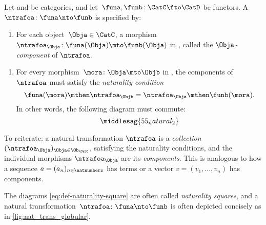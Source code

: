 \begin{ctdefinition}
    \label{def:natural-transformation}
    Let \CatC and \CatD be categories, and let~$\funa,\funb\colon \CatC\fto \CatD$ be functors.
    A \emph{}~$\ntrafoa \colon \funa\nto \funb$ is specified by:

    \constit
    \begin{enumerate}
        \item For each object~$\Obja\in \CatC$, a morphism $\ntrafoa_\Obja \colon \funa(\Obja)\mto \funb(\Obja)$ in \CatD, called the $\Obja$\emph{-component} of $\ntrafoa$.
    \end{enumerate}
    \condit
    \begin{enumerate}
        \item For every morphism~$\mora\colon \Obja\mto \Objb$ in \CatC, the components of $\ntrafoa$ must satisfy the \emph{naturality condition}
              \begin{equation}
                  \funa(\mora)\mthen \ntrafoa_\Objb = \ntrafoa_\Obja\mthen \funb(\mora).
              \end{equation}
              In other words, the following diagram must commute:
              \begin{equation}
                  \label{eq:def-naturality-square}
                  \middlesag{55_natural_2}
              \end{equation}
    \end{enumerate}
\end{ctdefinition}

To reiterate: a natural transformation $\ntrafoa$ is a \emph{collection} $(\ntrafoa_\Obja)_{\Obja \in \Ob_\CatC}$, satisfying the naturality conditions, and the individual morphisms $\ntrafoa_\Obja$ are its \emph{components}.
This is analogous to how a sequence $a = (a_n)_{n \in \natnumbers}$ has terms or a vector $v = (v_1, .
    .. , v_n)$ has components.

The diagrams \cref{eq:def-naturality-square} are often called \emph{naturality squares}, and a natural transformation~$\ntrafoa \colon \funa\nto \funb$ is often depicted concisely as in \cref{fig:nat_trans_globular}.

\begin{marginfigure}
    \centering
    \caption{}
    \label{fig:nat_trans_globular}
\end{marginfigure}
\begin{figure}[h!]
    \centering
    \begin{ctdefinitionshade}
    \end{ctdefinitionshade}
    \caption{}
    \label{fig:nat_trans_graphically}
\end{figure}

